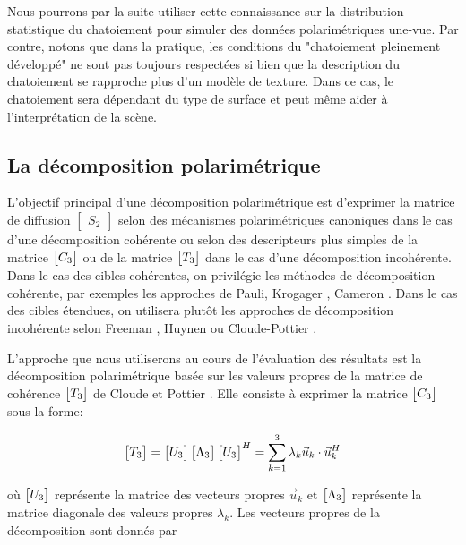 \vspace{10pt}

Nous pourrons par la suite utiliser cette connaissance sur la distribution statistique du chatoiement pour simuler des données polarimétriques une-vue. Par contre, notons que dans la pratique, les conditions du "chatoiement pleinement développé" ne sont pas toujours respectées si bien que la description du chatoiement se rapproche plus d'un modèle de texture. Dans ce cas, le chatoiement sera dépendant du type de surface et peut même aider à l’interprétation de la scène.  
 
 \subsection{La décomposition polarimétrique} \label{section:decomposition_polarimetric}
 
 L’objectif principal d’une décomposition polarimétrique est d'exprimer la matrice de diffusion $\begin{bmatrix} S_2 \end{bmatrix}$ selon des mécanismes polarimétriques  canoniques dans le cas d’une décomposition cohérente ou selon des descripteurs plus simples de la matrice  $\begin{bmatrix} C_3 \end{bmatrix}$  ou de la matrice  $\begin{bmatrix} T_3 \end{bmatrix}$  dans le cas d’une décomposition incohérente. Dans le cas des cibles cohérentes, on privilégie les méthodes de décomposition cohérente, par exemples les approches de Pauli, Krogager \cite{Krogager1990}, Cameron \cite{Cameron1996}.  Dans le cas des cibles étendues, on utilisera plutôt les approches de décomposition incohérente selon Freeman \cite{Freeman1998}, Huynen ou Cloude-Pottier \cite{Cloude1996}.
 
L'approche que nous utiliserons au cours de l'évaluation des résultats est la décomposition polarimétrique basée sur les valeurs propres de la matrice de cohérence $\begin{bmatrix} T_3 \end{bmatrix}$ de Cloude et Pottier \cite{Cloude1997}.  Elle consiste à exprimer la matrice $\begin{bmatrix} C_3 \end{bmatrix}$  sous la forme:

\begin{equation}
    \begin{bmatrix} T_3 \end{bmatrix}=\begin{bmatrix} U_3 \end{bmatrix} \begin{bmatrix} \Lambda_3 \end{bmatrix} \begin{bmatrix} U_3 \end{bmatrix}^H = \sum_{k=1}^{3} \lambda_k \Vec{u}_k\cdot \Vec{u}_k^H
\end{equation}

\vspace{10pt}

où $\begin{bmatrix} U_3 \end{bmatrix}$ représente la matrice des vecteurs propres $\Vec{u}_k$ et $\begin{bmatrix} \Lambda_3 \end{bmatrix}$ représente la matrice diagonale des valeurs propres $\lambda_k$. Les vecteurs propres de la décomposition sont donnés par 

